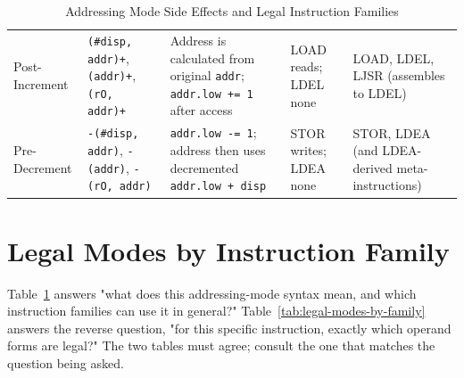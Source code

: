 \begin{table}[H]
\begin{tabularx}{\textwidth}{>{\raggedright\arraybackslash}p{1.8cm}>{\raggedright\arraybackslash}X>{\raggedright\arraybackslash}X>{\raggedright\arraybackslash}p{1.9cm}>{\raggedright\arraybackslash}X}
		Post-Increment          & \texttt{(\#disp, addr)+}, \texttt{(addr)+}, \texttt{(rO, addr)+}            & Address is calculated from original \texttt{addr}; \texttt{addr.low += 1} after access                               & LOAD reads; LDEL none                   & LOAD, LDEL, LJSR (assembles to LDEL)            \\
		Pre-Decrement           & \texttt{-(\#disp, addr)}, \texttt{-(addr)}, \texttt{-(rO, addr)}            & \texttt{addr.low -= 1}; address then uses decremented \texttt{addr.low + disp}                                       & STOR writes; LDEA none                  & STOR, LDEA (and LDEA-derived meta-instructions) \\
		\bottomrule
	\end{tabularx}
	\caption{Addressing Mode Side Effects and Legal Instruction Families}
	\label{tab:addressing-mode-matrix}
\end{table}

\section{Legal Modes by Instruction Family}

Table~\ref{tab:addressing-mode-matrix} answers "what does this addressing-mode syntax mean, and which instruction
families can use it in general?" Table~\ref{tab:legal-modes-by-family} answers the reverse question, "for this specific
instruction, exactly which operand forms are legal?" The two tables must agree; consult the one that matches the
question being asked.

